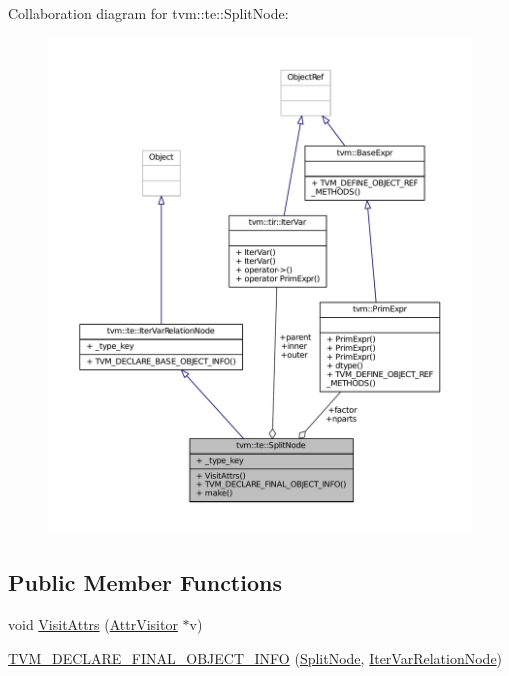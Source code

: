Collaboration diagram for tvm\+:\+:te\+:\+:Split\+Node\+:
\nopagebreak
\begin{figure}[H]
\begin{center}
\leavevmode
\includegraphics[width=350pt]{classtvm_1_1te_1_1SplitNode__coll__graph}
\end{center}
\end{figure}
\subsection*{Public Member Functions}
\begin{DoxyCompactItemize}
\item 
void \hyperlink{classtvm_1_1te_1_1SplitNode_a2af7d1cd6ed818f6f6c6e0c94a5e5614}{Visit\+Attrs} (\hyperlink{classtvm_1_1AttrVisitor}{Attr\+Visitor} $\ast$v)
\item 
\hyperlink{classtvm_1_1te_1_1SplitNode_ae140a619383fad245de4b86b00005d91}{T\+V\+M\+\_\+\+D\+E\+C\+L\+A\+R\+E\+\_\+\+F\+I\+N\+A\+L\+\_\+\+O\+B\+J\+E\+C\+T\+\_\+\+I\+N\+FO} (\hyperlink{classtvm_1_1te_1_1SplitNode}{Split\+Node}, \hyperlink{classtvm_1_1te_1_1IterVarRelationNode}{Iter\+Var\+Relation\+Node})
\end{DoxyCompactItemize}
